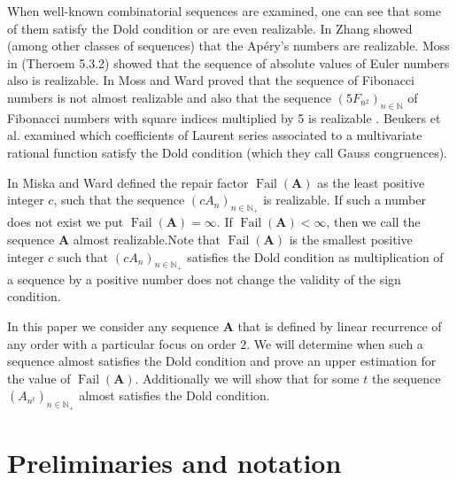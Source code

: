 \documentclass[preprint,12pt]{elsarticle}
\newcommand{\N}{\mathbb{N}}
\DeclareMathOperator{\fail}{Fail}
\begin{document}
When well-known combinatorial sequences are examined, one can see that some of them satisfy the Dold condition or are even realizable.
In \cite{combi} Zhang showed (among other classes of sequences) that the Apéry's
numbers are realizable.%
Moss in \cite{Phd} (Theroem 5.3.2) showed that the sequence of absolute values of Euler numbers also is realizable.
In \cite{Fibonacci} Moss and Ward proved that the sequence of Fibonacci numbers is not almost realizable and also that the sequence $(5F_{n^2})_{n\in\N}$ of Fibonacci numbers with square indices multiplied by 5 is  realizable . 
Beukers et al. \cite{laurent} examined which coefficients of Laurent series
associated to a multivariate rational function satisfy the Dold condition (which they call Gauss congruences).

In \cite{Stirling}  Miska and Ward defined the repair factor $\fail(\mathbf A)$ as the least positive integer $c$, such that the sequence $(cA_n)_{n\in\N_+}$ is realizable. If such a number does not exist we put $\fail(\mathbf A) = \infty$. If $\fail(\mathbf A) < \infty$, then we call the sequence $\textbf{A}$ almost realizable.Note that $\fail(\mathbf{A})$ is the smallest positive integer $c$ such that $(cA_n)_{n\in\N_+}$ satisfies the Dold condition as multiplication of a sequence by a positive number does not change the validity of the sign condition.








In this paper we consider any sequence $\mathbf{A}$ that is defined by linear recurrence of any order with a particular focus on order $2$. We will determine when such a sequence almost satisfies the Dold condition and prove an upper estimation for the value of $\fail(\mathbf{A})$. Additionally we will show that for some $t$ the sequence $({A}_{n^t})_{n\in\N_+}$ almost satisfies the Dold condition. 








\section{Preliminaries and notation }
\end{document}

